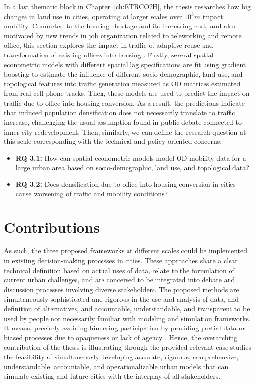 In a last thematic block in Chapter~\ref{ch:ETRCO2H}, the thesis researches how big changes in land use in cities, operating at larger scales over $10^3 m$ impact mobility. Connected to the housing shortage and its increasing cost, and also motivated by new trends in job organization related to teleworking and remote office, this section explores the impact in traffic of adaptive reuse and transformation of existing offices into housing \citep{Remy2014}. Firstly, several spatial econometric models with different spatial lag specifications \citep{LeSage2008SpatialFlows} are fit using gradient boosting \citep{Friedman2001GreedyMachine} to estimate the influence of different socio-demographic, land use, and topological features into traffic generation measured as OD matrices estimated from real cell phone tracks. Then, these models are used to predict the impact on traffic due to office into housing conversion. As a result, the predictions indicate that induced population densification does not necessarily translate to traffic increase, challenging the usual assumption found in public debate connected to inner city redevelopment. Then, similarly, we can define the research question at this scale corresponding with the technical and policy-oriented concerns:
\begin{itemize}
    \item \textbf{RQ 3.1:} How can spatial econometric models model OD mobility data for a large urban area based on socio-demographic, land use, and topological data?
    \item \textbf{RQ 3.2:} Does densification due to office into housing conversion in cities cause worsening of traffic and mobility conditions?
\end{itemize}

\section{Contributions}

As such, the three proposed frameworks at different scales could be implemented in existing decision-making processes in cities. These approaches share a clear technical definition based on actual uses of data, relate to the formulation of current urban challenges, and are conceived to be integrated into debate and discussion processes involving diverse stakeholders. The proposed methods are simultaneously sophisticated and rigorous in the use and analysis of data, and definition of alternatives, and accountable, understandable, and transparent to be used by people not necessarily familiar with modeling and simulation frameworks. It means, precisely avoiding hindering participation by providing partial data or biased processes due to opaqueness or lack of agency \citep{Blundell-Jones2005}. Hence, the overarching contribution of the thesis is illustrating through the provided relevant case studies the feasibility of simultaneously developing accurate, rigorous, comprehensive, understandable, accountable, and operationalizable urban models that can simulate existing and future cities with the interplay of all stakeholders.

